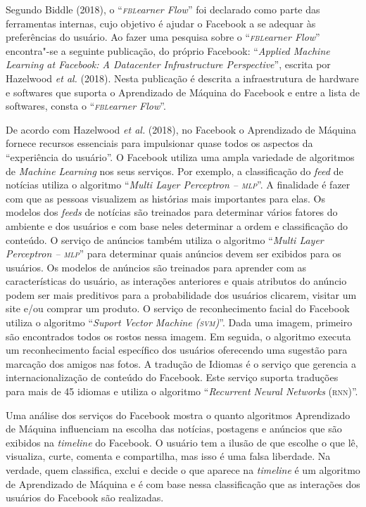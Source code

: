 Segundo Biddle (2018), o ``\emph{\textsc{fbl}earner Flow}'' foi declarado como
parte das ferramentas internas, cujo objetivo é ajudar o Facebook a se
adequar às preferências do usuário. Ao fazer uma pesquisa sobre o
``\emph{\textsc{fbl}earner Flow}'' encontra"-se a seguinte publicação, do próprio
Facebook: ``\emph{Applied Machine Learning at Facebook: A Datacenter
Infrastructure Perspective}'', escrita por Hazelwood \emph{et al.} (2018). Nesta
publicação é descrita a infraestrutura de hardware e softwares que
suporta o Aprendizado de Máquina do Facebook e entre a lista de
softwares, consta o ``\emph{\textsc{fbl}earner Flow}''.

De acordo com Hazelwood \emph{et al.} (2018), no Facebook o Aprendizado de
Máquina fornece recursos essenciais para impulsionar quase todos os
aspectos da ``experiência do usuário''. O Facebook utiliza uma ampla
variedade de algoritmos de \emph{Machine Learning} nos seus serviços.
Por exemplo, a classificação do \emph{feed} de notícias utiliza o
algoritmo ``\emph{Multi Layer Perceptron -- \textsc{mlp}}''. A finalidade é fazer
com que as pessoas visualizem as histórias mais importantes para elas.
Os modelos dos \emph{feeds} de notícias são treinados para determinar
vários fatores do ambiente e dos usuários e com base neles determinar a
ordem e classificação do conteúdo. O serviço de anúncios também utiliza
o algoritmo ``\emph{Multi Layer Perceptron -- \textsc{mlp}}'' para determinar
quais anúncios devem ser exibidos para os usuários. Os modelos de
anúncios são treinados para aprender com as características do usuário,
as interações anteriores e quais atributos do anúncio podem ser mais
preditivos para a probabilidade dos usuários clicarem, visitar um site
e/ou comprar um produto. O serviço de reconhecimento facial do Facebook
utiliza o algoritmo ``\emph{Suport Vector Machine (\textsc{svm})}''. Dada uma
imagem, primeiro são encontrados todos os rostos nessa imagem. Em
seguida, o algoritmo executa um reconhecimento facial específico dos
usuários oferecendo uma sugestão para marcação dos amigos nas fotos. A
tradução de Idiomas é o serviço que gerencia a internacionalização de
conteúdo do Facebook. Este serviço suporta traduções para mais de 45
idiomas e utiliza o algoritmo ``\emph{Recurrent Neural Networks}
(\textsc{rnn})''.

Uma análise dos serviços do Facebook mostra o quanto algoritmos
Aprendizado de Máquina influenciam na escolha das notícias, postagens e
anúncios que são exibidos na \emph{timeline} do Facebook. O usuário tem
a ilusão de que escolhe o que lê, visualiza, curte, comenta e
compartilha, mas isso é uma falsa liberdade. Na verdade, quem
classifica, exclui e decide o que aparece na \emph{timeline} é um
algoritmo de Aprendizado de Máquina e é com base nessa classificação que
as interações dos usuários do Facebook são realizadas.

